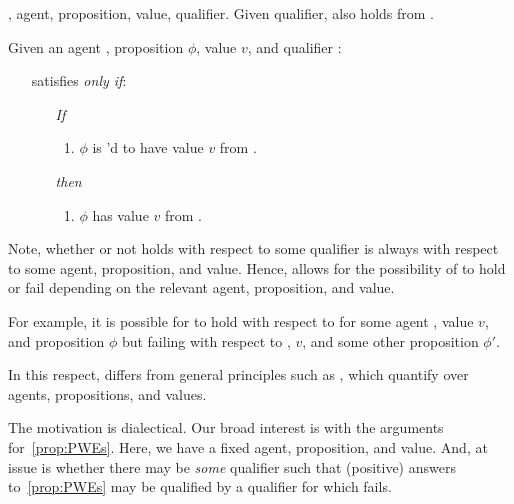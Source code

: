 \begin{note}
  , agent, proposition, value, qualifier.
  Given qualifier, also holds from \agpe{}.

  \begin{principle}[\ptivity{2}]
    \label{def:perspectivity}
    Given an agent \vAgent{}, proposition \(\phi\), value \(v\), and qualifier \ptivityQV{}:

    \begin{itemize}
    \item[]
      \ptivityQV{} satisfies \ptivity{} \emph{only if}:
    \item[]
      \begin{enumerate}[noitemsep]
      \item[\emph{If}]
        \begin{enumerate}[label=\alph*., ref=(\alph*)]
        \item
          \(\phi\) is \ptivityQV{}'d to have value \(v\) from .
        \end{enumerate}
      \item[\emph{then}]
        \begin{enumerate}[label=\alph*., ref=(\alph*), resume]
        \item
          \(\phi\) has value \(v\) from .
        \end{enumerate}
      \end{enumerate}
    \end{itemize}
    \vspace{-\baselineskip}
  \end{principle}

  Note, whether or not \ptivity{} holds with respect to some qualifier \ptivityQV{} is always with respect to some agent, proposition, and value.
  Hence, \ptivity{} allows for the possibility of \ptivity{} to hold or fail depending on the relevant agent, proposition, and value.

  For example, it is possible for \ptivity{} to hold with respect to \ptivityQV{} for some agent \vAgent{}, value \(v\), and proposition \(\phi\) but failing with respect to \vAgent{}, \(v\), and some other proposition \(\phi'\).

  In this respect, \ptivity{} differs from general principles such as \factivity{}, which quantify over agents, propositions, and values.

  The motivation is dialectical.
  Our broad interest is with the arguments for~\autoref{prop:PWEs}.
  Here, we have a fixed agent, proposition, and value.
  And, at issue is whether there may be \emph{some} qualifier such that (positive) answers to~\autoref{prop:PWEs} may be qualified by a qualifier for which \ptivity{} fails.


\end{note}

